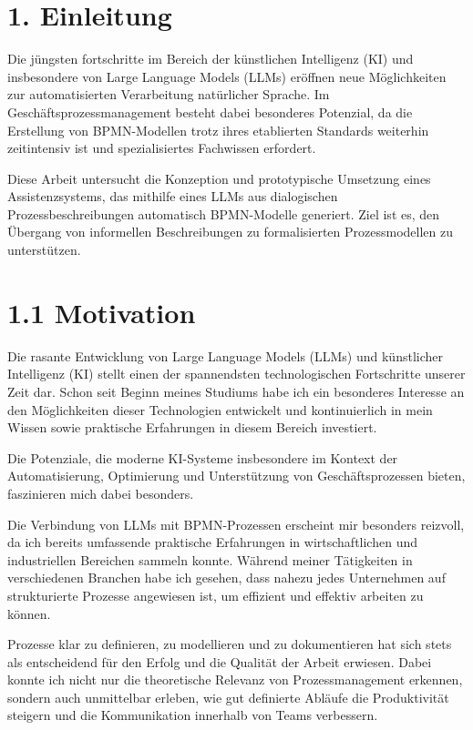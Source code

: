 \documentclass[a4paper,12pt]{scrreprt}
\begin{document}
\newpage

\section*{1. Einleitung}

Die jüngsten fortschritte im Bereich der künstlichen Intelligenz (KI) und insbesondere von Large Language Models (LLMs) eröffnen neue Möglichkeiten zur automatisierten Verarbeitung natürlicher Sprache. Im Geschäftsprozessmanagement besteht dabei besonderes Potenzial, da die Erstellung von BPMN-Modellen trotz ihres etablierten Standards weiterhin zeitintensiv ist und spezialisiertes Fachwissen erfordert.

Diese Arbeit untersucht die Konzeption und prototypische Umsetzung eines Assistenzsystems, das mithilfe eines LLMs aus dialogischen Prozessbeschreibungen automatisch BPMN-Modelle generiert. Ziel ist es, den Übergang von informellen Beschreibungen zu formalisierten Prozessmodellen zu unterstützen.

\section*{1.1 Motivation}

Die rasante Entwicklung von Large Language Models (LLMs) und künstlicher Intelligenz (KI) stellt einen der spannendsten technologischen Fortschritte unserer Zeit dar. Schon seit Beginn meines Studiums habe ich ein besonderes Interesse an den Möglichkeiten dieser Technologien entwickelt und kontinuierlich in mein Wissen sowie praktische Erfahrungen in diesem Bereich investiert.

Die Potenziale, die moderne KI-Systeme insbesondere im Kontext der Automatisierung, Optimierung und Unterstützung von Geschäftsprozessen bieten, faszinieren mich dabei besonders.

Die Verbindung von LLMs mit BPMN-Prozessen erscheint mir besonders reizvoll, da ich bereits umfassende praktische Erfahrungen in wirtschaftlichen und industriellen Bereichen sammeln konnte. Während meiner Tätigkeiten in verschiedenen Branchen habe ich gesehen, dass nahezu jedes Unternehmen auf strukturierte Prozesse angewiesen ist, um effizient und effektiv arbeiten zu können.

Prozesse klar zu definieren, zu modellieren und zu dokumentieren hat sich stets als entscheidend für den Erfolg und die Qualität der Arbeit erwiesen. Dabei konnte ich nicht nur die theoretische Relevanz von Prozessmanagement erkennen, sondern auch unmittelbar erleben, wie gut definierte Abläufe die Produktivität steigern und die Kommunikation innerhalb von Teams verbessern.
\end{document}
